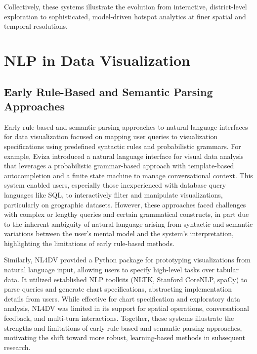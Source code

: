 Collectively, these systems illustrate the evolution from interactive, district-level exploration to sophisticated, model-driven hotspot analytics at finer spatial and temporal resolutions.






\section{NLP in Data Visualization}

\subsection{Early Rule-Based and Semantic Parsing Approaches}

Early rule-based and semantic parsing approaches to natural language interfaces for data visualization focused on mapping user queries to visualization specifications using predefined syntactic rules and probabilistic grammars. For example, Eviza \cite{Setlur2016Eviza} introduced a natural language interface for visual data analysis that leverages a probabilistic grammar-based approach with template-based autocompletion and a finite state machine to manage conversational context. This system enabled users, especially those inexperienced with database query languages like SQL, to interactively filter and manipulate visualizations, particularly on geographic datasets. However, these approaches faced challenges with complex or lengthy queries and certain grammatical constructs, in part due to the inherent ambiguity of natural language arising from syntactic and semantic variations between the user's mental model and the system's interpretation, highlighting the limitations of early rule-based methods.

Similarly, NL4DV \cite{Narechania2021NL4DV} provided a Python package for prototyping visualizations from natural language input, allowing users to specify high-level tasks over tabular data. It utilized established NLP toolkits (NLTK, Stanford CoreNLP, spaCy) to parse queries and generate chart specifications, abstracting implementation details from users. While effective for chart specification and exploratory data analysis, NL4DV was limited in its support for spatial operations, conversational feedback, and multi-turn interactions. Together, these systems illustrate the strengths and limitations of early rule-based and semantic parsing approaches, motivating the shift toward more robust, learning-based methods in subsequent research.


